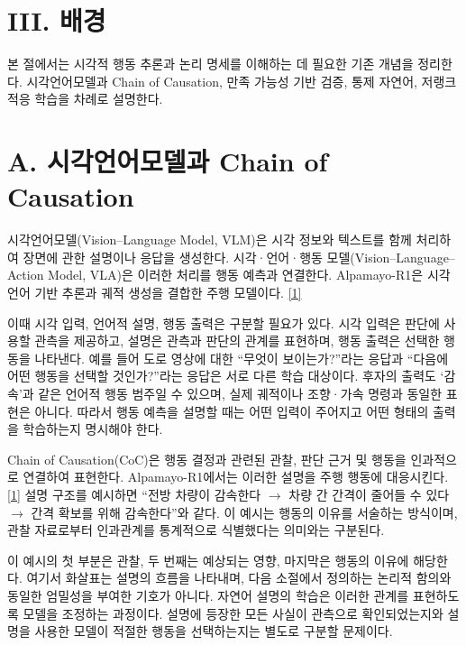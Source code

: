 \documentclass[11pt,a4paper]{article}
\begin{document}
\section*{III. 배경}


본 절에서는 시각적 행동 추론과 논리 명세를 이해하는 데 필요한 기존 개념을 정리한다. 시각언어모델과 Chain of Causation, 만족 가능성 기반 검증, 통제 자연어, 저랭크 적응 학습을 차례로 설명한다.\par

\section*{A. 시각언어모델과 Chain of Causation}

시각언어모델(Vision–Language Model, VLM)은 시각 정보와 텍스트를 함께 처리하여 장면에 관한 설명이나 응답을 생성한다. 시각·언어·행동 모델(Vision–Language–Action Model, VLA)은 이러한 처리를 행동 예측과 연결한다. Alpamayo-R1은 시각언어 기반 추론과 궤적 생성을 결합한 주행 모델이다. \href{\detokenize{https://arxiv.org/abs/2511.00088}}{[1]}\par

이때 시각 입력, 언어적 설명, 행동 출력은 구분할 필요가 있다. 시각 입력은 판단에 사용할 관측을 제공하고, 설명은 관측과 판단의 관계를 표현하며, 행동 출력은 선택한 행동을 나타낸다. 예를 들어 도로 영상에 대한 “무엇이 보이는가?”라는 응답과 “다음에 어떤 행동을 선택할 것인가?”라는 응답은 서로 다른 학습 대상이다. 후자의 출력도 ‘감속’과 같은 언어적 행동 범주일 수 있으며, 실제 궤적이나 조향·가속 명령과 동일한 표현은 아니다. 따라서 행동 예측을 설명할 때는 어떤 입력이 주어지고 어떤 형태의 출력을 학습하는지 명시해야 한다.\par

Chain of Causation(CoC)은 행동 결정과 관련된 관찰, 판단 근거 및 행동을 인과적으로 연결하여 표현한다. Alpamayo-R1에서는 이러한 설명을 주행 행동에 대응시킨다. \href{\detokenize{https://arxiv.org/abs/2511.00088}}{[1]} 설명 구조를 예시하면 “전방 차량이 감속한다 \ensuremath{\rightarrow} 차량 간 간격이 줄어들 수 있다 \ensuremath{\rightarrow} 간격 확보를 위해 감속한다”와 같다. 이 예시는 행동의 이유를 서술하는 방식이며, 관찰 자료로부터 인과관계를 통계적으로 식별했다는 의미와는 구분된다.\par

이 예시의 첫 부분은 관찰, 두 번째는 예상되는 영향, 마지막은 행동의 이유에 해당한다. 여기서 화살표는 설명의 흐름을 나타내며, 다음 소절에서 정의하는 논리적 함의와 동일한 엄밀성을 부여한 기호가 아니다. 자연어 설명의 학습은 이러한 관계를 표현하도록 모델을 조정하는 과정이다. 설명에 등장한 모든 사실이 관측으로 확인되었는지와 설명을 사용한 모델이 적절한 행동을 선택하는지는 별도로 구분할 문제이다.\par
\end{document}
